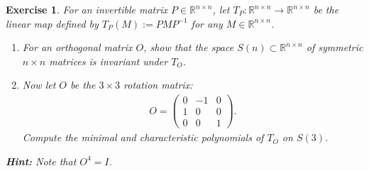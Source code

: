 \documentclass[11pt]{article}
\newtheorem{exercise}{Exercise}[section]
\theoremstyle{definition}
\numberwithin{equation}{subsection}
\begin{document}
\begin{exercise}
For an invertible matrix $P \in \mathbb{R}^{n \times n}$, let $T_P: \mathbb{R}^{n \times n} \to \mathbb{R}^{n \times n}$ be the linear map defined by $T_P(M):= PMP^{-1}$ for any $M \in \mathbb{R}^{n \times n}$.
\begin{enumerate}[label=(\alph*)]
    \item For an orthogonal matrix $O$, show that the space $S(n) \subset \mathbb{R}^{n \times n}$ of symmetric $n \times n$ matrices is invariant under $T_O$.
    
    \item Now let $O$ be the $3 \times 3$ rotation matrix:
    \begin{align*}
        O = \begin{pmatrix}
            0 & -1 & 0 \\
            1 & 0  & 0 \\
            0 & 0  & 1
        \end{pmatrix}.
    \end{align*}
    Compute the minimal and characteristic polynomials of $T_O$ on $S(3)$.
\end{enumerate}
{\bf Hint:} Note that $O^4 = I$.
\end{exercise}
\end{document}
